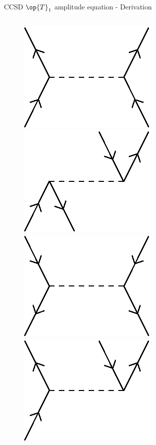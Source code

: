 \begin{frame}{CCSD $\op{T}_1$ amplitude equation - Derivation }
\begin{columns}[t]
\begin{figure}
        \parbox{0.20\textwidth}{
            \centering
            \includegraphics[scale=0.35]{graphics/v4}} 
        \parbox{0.20\textwidth}{
            \centering
            \includegraphics[scale=0.35]{graphics/v5}} 
        \parbox{0.20\textwidth}{
            \centering
            \includegraphics[scale=0.35]{graphics/v6}} 
        \parbox{0.20\textwidth}{
            \centering
            \includegraphics[scale=0.35]{graphics/v7}} 

\end{figure}
\end{columns}
\end{frame}
